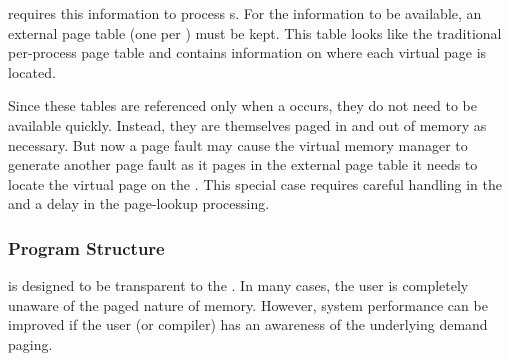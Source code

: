  requires this information to process s.
For the information to be available, an external page table (one per ) must be kept.
This table looks like the traditional per-process page table and contains information on where each virtual page is located.

Since these tables are referenced only when a  occurs, they do not need to be available quickly.
Instead, they are themselves paged in and out of memory as necessary.
But now a page fault may cause the virtual memory manager to generate another page fault as it pages in the external page table it needs to locate the virtual page on the .
This special case requires careful handling in the  and a delay in the page-lookup processing.

\subsubsection{Program Structure}\label{subsubsec:Program_Structure}
 is designed to be transparent to the  .
In many cases, the user is completely unaware of the paged nature of memory.
However, system performance can be improved if the user (or compiler) has an awareness of the underlying demand paging.

